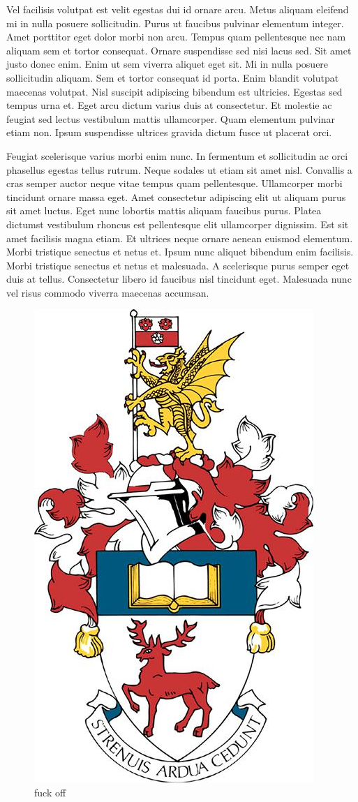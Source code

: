 Vel facilisis volutpat est velit egestas dui id ornare arcu. Metus aliquam eleifend mi in nulla posuere sollicitudin. Purus ut faucibus pulvinar elementum integer. Amet porttitor eget dolor morbi non arcu. Tempus quam pellentesque nec nam aliquam sem et tortor consequat. Ornare suspendisse sed nisi lacus sed. Sit amet justo donec enim. Enim ut sem viverra aliquet eget sit. Mi in nulla posuere sollicitudin aliquam. Sem et tortor consequat id porta. Enim blandit volutpat maecenas volutpat. Nisl suscipit adipiscing bibendum est ultricies. Egestas sed tempus urna et. Eget arcu dictum varius duis at consectetur. Et molestie ac feugiat sed lectus vestibulum mattis ullamcorper. Quam elementum pulvinar etiam non. Ipsum suspendisse ultrices gravida dictum fusce ut placerat orci.

Feugiat scelerisque varius morbi enim nunc. In fermentum et sollicitudin ac orci phasellus egestas tellus rutrum. Neque sodales ut etiam sit amet nisl. Convallis a cras semper auctor neque vitae tempus quam pellentesque. Ullamcorper morbi tincidunt ornare massa eget. Amet consectetur adipiscing elit ut aliquam purus sit amet luctus. Eget nunc lobortis mattis aliquam faucibus purus. Platea dictumst vestibulum rhoncus est pellentesque elit ullamcorper dignissim. Est sit amet facilisis magna etiam. Et ultrices neque ornare aenean euismod elementum. Morbi tristique senectus et netus et. Ipsum nunc aliquet bibendum enim facilisis. Morbi tristique senectus et netus et malesuada. A scelerisque purus semper eget duis at tellus. Consectetur libero id faucibus nisl tincidunt eget. Malesuada nunc vel risus commodo viverra maecenas accumsan.

\begin{figure}[!htbp]
    \center
    \includegraphics[width=0.3\linewidth]{images/crest.jpg}
    \caption{fuck off}
    \label{fig:example}
\end{figure}

